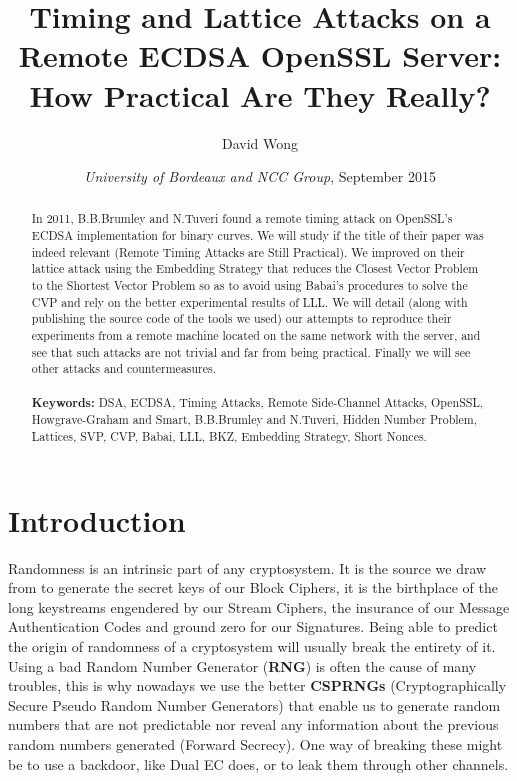 \documentclass[a4paper,11pt]{article}
\title{Timing and Lattice Attacks on a Remote ECDSA OpenSSL Server: How Practical Are They Really?}
\author{David Wong}
\date{\emph{University of Bordeaux and NCC Group}, \small{September 2015}}
\begin{document}
\maketitle

\renewcommand{\abstractname}{Abstract}
\begin{abstract}
In 2011, B.B.Brumley and N.Tuveri found a remote timing attack on OpenSSL's ECDSA implementation for binary curves. We will study if the title of their paper was indeed relevant (Remote Timing Attacks are Still Practical). We improved on their lattice attack using the Embedding Strategy that reduces the Closest Vector Problem to the Shortest Vector Problem so as to avoid using Babai's procedures to solve the CVP and rely on the better experimental results of LLL. We will detail (along with publishing the source code of the tools we used) our attempts to reproduce their experiments from a remote machine located on the same network with the server, and see that such attacks are not trivial and far from being practical. Finally we will see other attacks and countermeasures.\\
\\
\textbf{Keywords:} DSA, ECDSA, Timing Attacks, Remote Side-Channel Attacks, OpenSSL, Howgrave-Graham and Smart, B.B.Brumley and N.Tuveri, Hidden Number Problem, Lattices, SVP, CVP, Babai, LLL, BKZ, Embedding Strategy, Short Nonces.\\

\end{abstract}

\section{Introduction}\label{introduction}

Randomness is an intrinsic part of any cryptosystem. It is the source we draw from to generate the secret keys of our Block Ciphers, it is the birthplace of the long keystreams engendered by our Stream Ciphers, the insurance of our Message Authentication Codes and ground zero for our Signatures. Being able to predict the origin of randomness of a cryptosystem will usually break the entirety of it. Using a bad Random Number Generator (\textbf{RNG}) is often the cause of many troubles, this is why nowadays we use the better \textbf{CSPRNGs} (Cryptographically Secure Pseudo Random Number Generators) that enable us to generate random numbers that are not predictable nor reveal any information about the previous random numbers generated (Forward Secrecy). One way of breaking these might be to use a backdoor, like Dual EC\cite{dualec} does, or to leak them through other channels.
\end{document}
